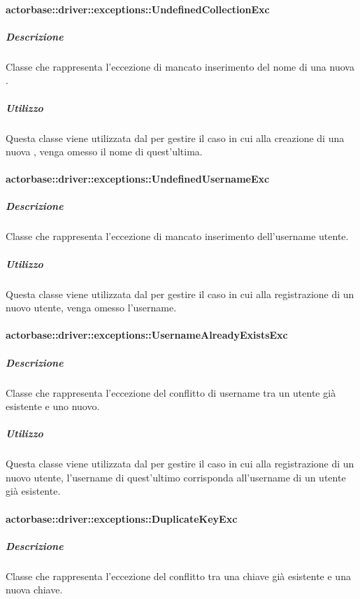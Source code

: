 \documentclass{scalatekids-article}
\begin{document}
\paragraph{actorbase::driver::exceptions::UndefinedCollectionExc}

\subparagraph{Descrizione}

Classe che rappresenta l'eccezione di mancato inserimento del nome di una nuova .

\subparagraph{Utilizzo}

Questa classe viene utilizzata dal  per gestire il caso in cui alla creazione di una nuova , venga omesso il nome di quest'ultima.

\paragraph{actorbase::driver::exceptions::UndefinedUsernameExc}

\subparagraph{Descrizione}

Classe che rappresenta l'eccezione di mancato inserimento dell'username utente.

\subparagraph{Utilizzo}

Questa classe viene utilizzata dal  per gestire il caso in cui alla registrazione di un nuovo utente, venga omesso l'username.

\paragraph{actorbase::driver::exceptions::UsernameAlreadyExistsExc}

\subparagraph{Descrizione}

Classe che rappresenta l'eccezione del conflitto di username tra un utente già esistente e uno nuovo.

\subparagraph{Utilizzo}

Questa classe viene utilizzata dal  per gestire il caso in cui alla registrazione di un nuovo utente, l'username di quest'ultimo corrisponda all'username di un utente già esistente.

\paragraph{actorbase::driver::exceptions::DuplicateKeyExc}

\subparagraph{Descrizione}

Classe che rappresenta l'eccezione del conflitto tra una chiave già esistente e una nuova chiave.
\end{document}
